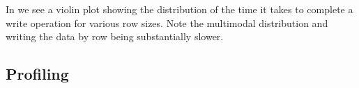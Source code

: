 In  we see a violin plot showing the distribution of the time it takes to complete a write operation for various row sizes. Note the multimodal distribution and writing the data by row being substantially slower.


\begin{figure}[htbp]
	\centering
	
	\caption{}
	\label{fig:rowlen}
\end{figure}%

\begin{figure}[htbp]
	\centering
	
	\caption{}
	\label{fig:}
\end{figure}

\begin{figure}[htbp]
	\centering
	
	\caption{}
	\label{fig:}
\end{figure}

\subsection{Profiling} \label{sec:profile}
